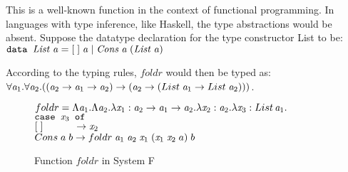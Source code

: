 This is a well-known function in the context of functional programming. In languages with type inference, like Haskell, the type abstractions would be absent.
Suppose the datatype declaration for the type constructor List to be:\\
$\mathit{\texttt{data } List\; \mathit{a} = [\;]\;\mathit{a}\;|\;Cons \;\mathit{a}\;(\mathit{List}\;\mathit{a})}$

According to the typing rules, $foldr$ would then be typed as:\\
$\forall {\mathit{a}_1} . {\forall {\mathit{a}_2} . {((\mathit{a}_2 \rightarrow \mathit{a}_1 \rightarrow \mathit{a}_2)\rightarrow (\mathit{a}_2 \rightarrow (List\;\mathit{a}_1\rightarrow List\;\mathit{a}_2)))}}$.

\begin{figure}
  
  $foldr = \Lambda \mathit{a}_1 . \Lambda \mathit{a}_2 . \lambda \mathit{x}_1:\mathit{a}_2 \rightarrow \mathit{a}_1 \rightarrow \mathit{a}_2 . \lambda \mathit{x}_2 : \mathit{a}_2 . \lambda \mathit{x}_3 : List \, \mathit{a}_1 .$\\
  \phantom{foldl aaa}$\mathit{\texttt{case }} \mathit{x}_3 \mathit{\texttt{ of }}$\\
  \phantom{foldl aaaaa}$[\;] \phantom{ns a b iii}\rightarrow \mathit{x}_2$\\
  \phantom{foldl aaaaa}$Cons \; a \; b \rightarrow foldr \; \mathit{a}_1 \;\mathit{a}_2 \; \mathit{x}_1 \; (\mathit{x}_1 \; \mathit{x}_2 \; a)  \; b$
  
  
  \caption{Function $foldr$ in System F}
  \label{foldr}
\end{figure}


